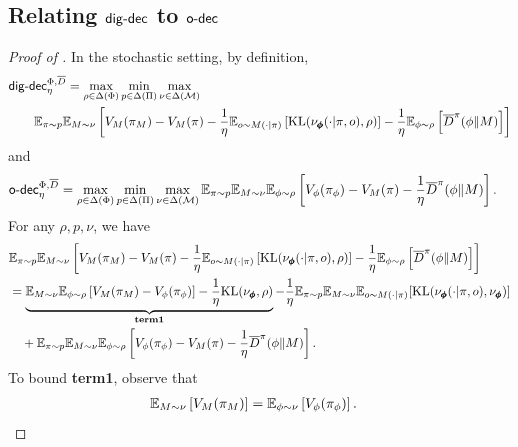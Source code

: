 \subsection{Relating $\mathsf{dig}\text{-}\mathsf{dec}$ to $\mathsf{o}\text{-}\mathsf{dec}$}
\begin{proof}[Proof of ]
In the stochastic setting, by definition, 
\begin{align*}
    &\mathsf{dig}\text{-}\mathsf{dec}_\eta^{\Phi,\overline{D}}
    =\max_{\rho\in\Delta(\Phi)} \min_{p\in\Delta(\Pi)} \max_{\nu\in \Delta(\mathcal{M})} \\
    &\qquad \mathbb{E}_{\pi\sim p}\mathbb{E}_{M\sim \nu} \left[ V_M(\pi_M) - V_M(\pi) - \frac{1}{\eta}\mathbb{E}_{o\sim M(\cdot|\pi)}\left[\text{KL}(\nu_{\pmb{\phi}}(\cdot|\pi, o), \rho)\right] - \frac{1}{\eta} \mathbb{E}_{\phi\sim \rho}\left[\overline{D}^\pi(\phi\|M)\right]  \right]
    \end{align*}
    and 
    \begin{align*}
    \mathsf{o}\text{-}\mathsf{dec}_\eta^{\Phi,\overline{D}} &= \max_{\rho\in\Delta(\Phi)} \min_{p\in\Delta(\Pi)} \max_{\nu\in \Delta(\mathcal{M})} \mathbb{E}_{\pi\sim p}\mathbb{E}_{M\sim \nu}\mathbb{E}_{\phi \sim \rho}\left[ V_\phi(\pi_\phi) - V_M(\pi) - \frac{1}{\eta} \overline{D}^\pi(\phi\|M)\right].   
\end{align*}
For any $\rho, p, \nu$, we have
\begin{align*}
&\mathbb{E}_{\pi\sim p}\mathbb{E}_{M\sim \nu}\left[ V_M(\pi_M) - V_M(\pi) - \frac{1}{\eta}\mathbb{E}_{o\sim M(\cdot|\pi)}\left[\text{KL}(\nu_{\pmb{\phi}}(\cdot|\pi, o), \rho)\right] - \frac{1}{\eta} \mathbb{E}_{\phi\sim \rho}\left[\overline{D}^\pi(\phi\|M)\right]  \right]   
\\&= \underbrace{\mathbb{E}_{M\sim \nu}\mathbb{E}_{\phi \sim \rho}\left[ V_M(\pi_M) - V_{\phi}(\pi_{\phi})   \right]- \frac{1}{\eta}\text{KL}(\nu_{\pmb{\phi}}, \rho) }_{\textbf{term1}} - \frac{1}{\eta} \mathbb{E}_{\pi\sim p} \mathbb{E}_{M\sim \nu} \mathbb{E}_{o\sim M(\cdot|\pi)} [\text{KL}(\nu_{\pmb{\phi}}(\cdot|\pi, o), \nu_{\pmb{\phi}})]  
\\&\quad + \mathbb{E}_{\pi\sim p}\mathbb{E}_{M\sim \nu}\mathbb{E}_{\phi \sim \rho}\left[ V_{\phi}(\pi_\phi) - V_M(\pi)- \frac{1}{\eta} \overline{D}^\pi(\phi\|M)  \right].   
\end{align*}
To bound \textbf{term1}, observe that
\begin{align*}
    \E_{M\sim \nu}\left[ V_M(\pi_M)\right] &= \E_{\phi \sim \nu}\left[ V_{\phi}(\pi_{\phi})\right].  

\end{align*}
\end{proof}
